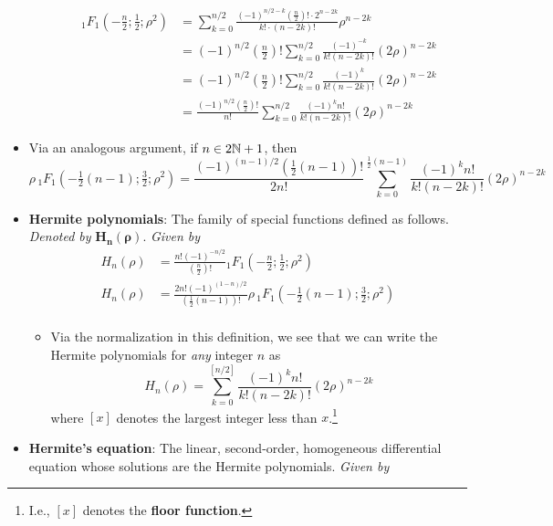 \documentclass[../finalProject.tex]{subfiles}
\begin{document}
\begin{itemize}
\begin{itemize}
        \begin{align*}
            {}_1F_1(-\tfrac{n}{2};\tfrac{1}{2};\rho^2) &= \sum_{k=0}^{n/2}\frac{(-1)^{n/2-k}\left( \frac{n}{2} \right)!\cdot 2^{n-2k}}{k!\cdot(n-2k)!}\rho^{n-2k}\\
            &= (-1)^{n/2}\left( \tfrac{n}{2} \right)!\sum_{k=0}^{n/2}\frac{(-1)^{-k}}{k!(n-2k)!}(2\rho)^{n-2k}\\
            &= (-1)^{n/2}\left( \tfrac{n}{2} \right)!\sum_{k=0}^{n/2}\frac{(-1)^k}{k!(n-2k)!}(2\rho)^{n-2k}\\
            &= \frac{(-1)^{n/2}\left( \frac{n}{2} \right)!}{n!}\sum_{k=0}^{n/2}\frac{(-1)^kn!}{k!(n-2k)!}(2\rho)^{n-2k}
        \end{align*}
    \end{itemize}
    \item Via an analogous argument, if $n\in 2\mathbb{N}+1$, then
    \begin{equation*}
        \rho\,{}_1F_1(-\tfrac{1}{2}(n-1);\tfrac{3}{2};\rho^2) = \frac{(-1)^{(n-1)/2}\left( \frac{1}{2}(n-1) \right)!}{2n!}\sum_{k=0}^{\frac{1}{2}(n-1)}\frac{(-1)^kn!}{k!(n-2k)!}(2\rho)^{n-2k}
    \end{equation*}
    \item \textbf{Hermite polynomials}: The family of special functions defined as follows. \emph{Denoted by} $\bm{H_n(\rho)}$. \emph{Given by}
    \begin{align*}
        H_n(\rho) &= \frac{n!(-1)^{-n/2}}{\left( \frac{n}{2} \right)!}{}_1F_1(-\tfrac{n}{2};\tfrac{1}{2};\rho^2)\tag{$n$ even}\\
        H_n(\rho) &= \frac{2n!(-1)^{(1-n)/2}}{\left( \frac{1}{2}(n-1) \right)!}\rho\,{}_1F_1(-\tfrac{1}{2}(n-1);\tfrac{3}{2};\rho^2)\tag{$n$ odd}\\
    \end{align*}
    \begin{itemize}
        \item Via the normalization in this definition, we see that we can write the Hermite polynomials for \emph{any} integer $n$ as
        \begin{equation*}
            H_n(\rho) = \sum_{k=0}^{[n/2]}\frac{(-1)^kn!}{k!(n-2k)!}(2\rho)^{n-2k}
        \end{equation*}
        where $[x]$ denotes the largest integer less than $x$.\footnote{I.e., $[x]$ denotes the \textbf{floor function}.}
    \end{itemize}
    \item \textbf{Hermite's equation}: The linear, second-order, homogeneous differential equation whose solutions are the Hermite polynomials. \emph{Given by}

\end{itemize}
\end{document}
